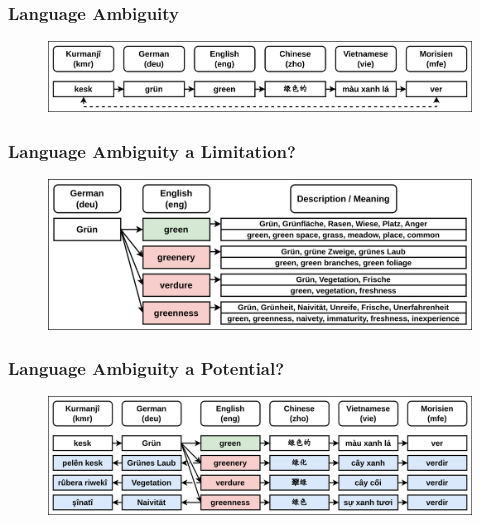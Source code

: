 \documentclass[aspectratio=169]{beamer}
\begin{document}
\begin{frame}[fragile]
	\frametitle{Language Ambiguity}
    \begin{figure}
        \centering
        \includegraphics[width=1.0\textwidth]{images/CRAMT-Tool-WordAlignmentExample.png} 
    \end{figure}
\end{frame}

\begin{frame}[fragile]
	\frametitle{Language Ambiguity a Limitation?}
    \begin{figure}
        \centering
        \includegraphics[width=1.0\textwidth]{images/CRAMT-Tool-WordAlignmentLimitation.png} 
    \end{figure}
\end{frame}

\begin{frame}[fragile]
	\frametitle{Language Ambiguity a Potential?}
    \begin{figure}
        \centering
        \includegraphics[width=1.0\textwidth]{images/CRAMT-Tool-WordAlignmentLimitationExample.png} 
    \end{figure}
\end{frame}
\end{document}
